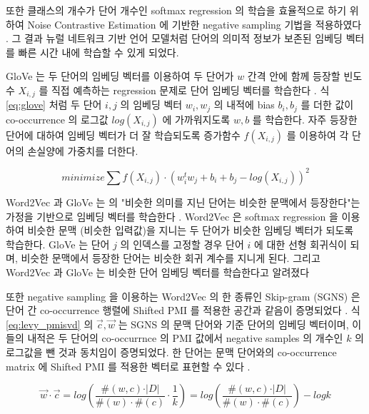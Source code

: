 \documentclass[oneside, ko,phd]{snuthesis_utf8_kor}
\begin{document}
또한 클래스의 개수가 단어 개수인 softmax regression 의 학습을 효율적으로 하기 위하여 Noise Contrastive Estimation \cite{gutmann2010noise} 에 기반한 negative sampling 기법을 적용하였다 \cite{mikolov2013distributed}.
그 결과 뉴럴 네트워크 기반 언어 모델처럼 단어의 의미적 정보가 보존된 임베딩 벡터를 빠른 시간 내에 학습할 수 있게 되었다.

GloVe 는 두 단어의 임베딩 벡터를 이용하여 두 단어가 $w$ 간격 안에 함께 등장할 빈도수 $X_{i,j}$ 를 직접 예측하는 regression 문제로 단어 임베딩 벡터를 학습한다 \cite{pennington2014glove}.
식 \ref{eq:glove} 처럼 두 단어 $i, j$ 의 임베딩 벡터 $w_i, w_j$ 의 내적에 bias $b_i, b_j$ 를 더한 값이 co-occurrence 의 로그값 $log(X_{i,j})$ 에 가까워지도록 $w, b$ 를 학습한다.
자주 등장한 단어에 대하여 임베딩 벡터가 더 잘 학습되도록 증가함수 $f(X_{i,j})$ 를 이용하여 각 단어의 손실양에 가중치를 더한다.

\begin{equation}
  \label{eq:glove}
  minimize \sum f(X_{i,j}) \cdot \left( w_i^t w_j + b_i + b_j - log(X_{i,j}) \right)^2
\end{equation}

Word2Vec 과 GloVe 는 \cite{harris1954distributional} 의 "비슷한 의미를 지닌 단어는 비슷한 문맥에서 등장한다"는 가정을 기반으로 임베딩 벡터를 학습한다 .
Word2Vec 은 softmax regression 을 이용하여 비슷한 문맥 (비슷한 입력값)을 지니는 두 단어가 비슷한 임베딩 벡터가 되도록 학습한다.
GloVe 는 단어 $j$ 의 인덱스를 고정할 경우 단어 $i$ 에 대한 선형 회귀식이 되며, 비슷한 문맥에서 등장한 단어는 비슷한 회귀 계수를 지니게 된다.
그리고 Word2Vec 과 GloVe 는 비슷한 단어 임베딩 벡터를 학습한다고 알려졌다 \cite{levy2015improving}

또한 negative sampling 을 이용하는 Word2Vec 의 한 종류인 Skip-gram (SGNS) 은 단어 간 co-occurrence 행렬에 Shifted PMI 를 적용한 공간과 같음이 증명되었다 \cite{levy2014neural}.
식 \ref{eq:levy_pmisvd} 의 $\vec{c}, \vec{w}$ 는 SGNS 의 문맥 단어와 기준 단어의 임베딩 벡터이며, 이들의 내적은 두 단어의 co-occurrnce 의 PMI 값에서 negative samples 의 개수인 $k$ 의 로그값을 뺀 것과 동치임이 증명되었다.
한 단어는 문맥 단어와의 co-occurrence matrix 에 Shifted PMI 를 적용한 벡터로 표현할 수 있다 \cite{levy2014neural}.

\begin{equation}
  \label{eq:levy_pmisvd}
  \vec{w} \cdot \vec{c} = log \left( \frac{\#(w,c) \cdot \vert D \vert}{\#(w) \cdot \#(c)} \cdot \frac{1}{k} \right) = log \left( \frac{\#(w,c) \cdot \vert D \vert}{\#(w) \cdot \#(c)} \right) - log k
\end{equation}
\end{document}
